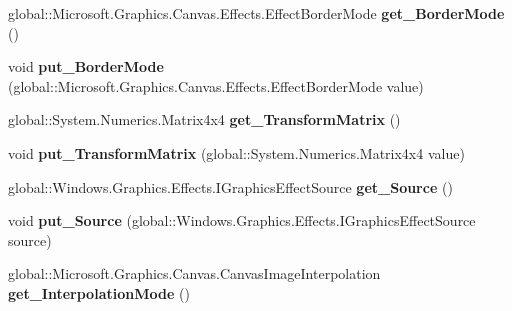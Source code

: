\begin{DoxyCompactItemize}
global\+::\+Microsoft.\+Graphics.\+Canvas.\+Effects.\+Effect\+Border\+Mode {\bfseries get\+\_\+\+Border\+Mode} ()
\item 
\mbox{\label{interface_microsoft_1_1_graphics_1_1_canvas_1_1_effects_1_1_i_transform3_d_effect_a25a24175bd4b6592a9795eee3b7b7566}} 
void {\bfseries put\+\_\+\+Border\+Mode} (global\+::\+Microsoft.\+Graphics.\+Canvas.\+Effects.\+Effect\+Border\+Mode value)
\item 
\mbox{\label{interface_microsoft_1_1_graphics_1_1_canvas_1_1_effects_1_1_i_transform3_d_effect_a2bbd145f06ce7bf83aa605e71a35418b}} 
global\+::\+System.\+Numerics.\+Matrix4x4 {\bfseries get\+\_\+\+Transform\+Matrix} ()
\item 
\mbox{\label{interface_microsoft_1_1_graphics_1_1_canvas_1_1_effects_1_1_i_transform3_d_effect_a60689b755d5b8543e291b86faa19538b}} 
void {\bfseries put\+\_\+\+Transform\+Matrix} (global\+::\+System.\+Numerics.\+Matrix4x4 value)
\item 
\mbox{\label{interface_microsoft_1_1_graphics_1_1_canvas_1_1_effects_1_1_i_transform3_d_effect_a5d51e9e7c23c1b2a2f1342b8c9101cae}} 
global\+::\+Windows.\+Graphics.\+Effects.\+I\+Graphics\+Effect\+Source {\bfseries get\+\_\+\+Source} ()
\item 
\mbox{\label{interface_microsoft_1_1_graphics_1_1_canvas_1_1_effects_1_1_i_transform3_d_effect_a3c2e3d14006f206763b75fd09797eb37}} 
void {\bfseries put\+\_\+\+Source} (global\+::\+Windows.\+Graphics.\+Effects.\+I\+Graphics\+Effect\+Source source)
\item 
\mbox{\label{interface_microsoft_1_1_graphics_1_1_canvas_1_1_effects_1_1_i_transform3_d_effect_aefc252bdfd3579f343b3a345dba1a4f3}} 
global\+::\+Microsoft.\+Graphics.\+Canvas.\+Canvas\+Image\+Interpolation {\bfseries get\+\_\+\+Interpolation\+Mode} ()

\end{DoxyCompactItemize}
